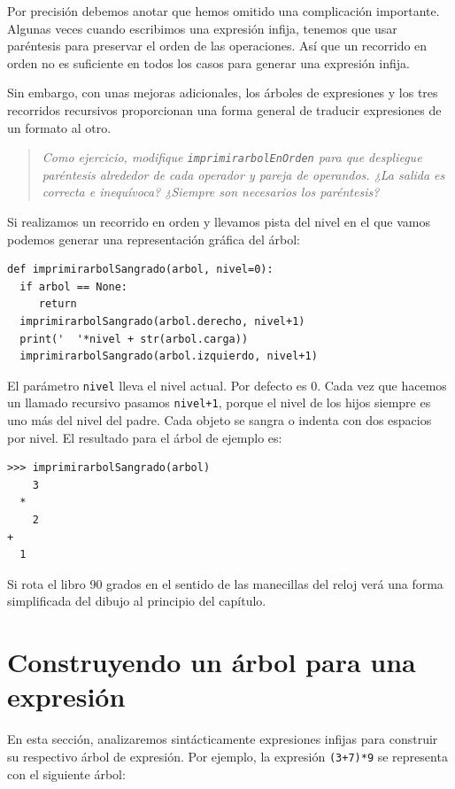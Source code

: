 Por precisión debemos anotar que hemos omitido una complicación importante.
Algunas veces cuando escribimos una expresión infija, tenemos que
usar paréntesis para preservar el orden de las operaciones. Así que
un recorrido en orden no es suficiente en todos los casos para generar
una expresión infija.

Sin embargo, con unas mejoras adicionales, los árboles de expresiones
y los tres recorridos recursivos proporcionan una forma general de
traducir expresiones de un formato al otro.
\begin{quote}
{\em Como ejercicio, modifique \texttt{imprimirarbolEnOrden} para
que despliegue paréntesis alrededor de cada operador y pareja de operandos.
¿La salida es correcta e inequívoca? ¿Siempre son necesarios los paréntesis?
} 
\end{quote}
Si realizamos un recorrido en orden y llevamos pista del nivel en
el que vamos podemos generar una representación gráfica del árbol:

\beforeverb 
\begin{verbatim}
def imprimirarbolSangrado(arbol, nivel=0):
  if arbol == None: 
     return
  imprimirarbolSangrado(arbol.derecho, nivel+1)
  print('  '*nivel + str(arbol.carga))
  imprimirarbolSangrado(arbol.izquierdo, nivel+1)
\end{verbatim}
\afterverb El parámetro \texttt{nivel} lleva el nivel actual. Por
defecto es 0. Cada vez que hacemos un llamado recursivo pasamos \texttt{nivel+1},
porque el nivel de los hijos siempre es uno más del nivel del padre.
Cada objeto se sangra o indenta con dos espacios por nivel. El resultado
para el árbol de ejemplo es:

\beforeverb 
\begin{verbatim}
>>> imprimirarbolSangrado(arbol)
    3
  *
    2
+
  1
\end{verbatim}
\afterverb Si rota el libro 90 grados en el sentido de las manecillas
del reloj verá una forma simplificada del dibujo al principio del
capítulo.

\section{Construyendo un árbol para una expresión}

  

En esta sección, analizaremos sintácticamente expresiones infijas
para construir su respectivo árbol de expresión. Por ejemplo, la expresión
\texttt{(3+7){*}9} se representa con el siguiente árbol:

